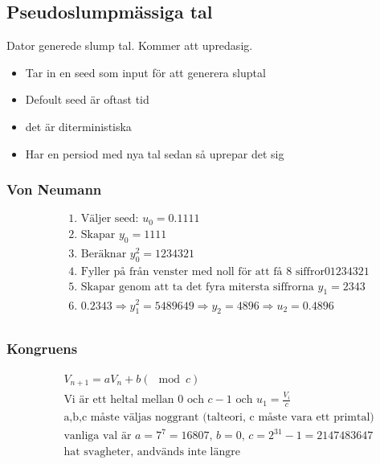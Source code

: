 \subsection{Pseudoslumpmässiga tal}
Dator generede slump tal. Kommer att upredasig.
\begin{itemize}
  \item Tar in en seed som input för att generera sluptal
  \item Defoult seed är oftast tid
  \item det är diterministiska
  \item Har en persiod med nya tal sedan så uprepar det sig
\end{itemize}

\subsubsection{Von Neumann}
\begin{align*}
  &\quad  \text{1. Väljer seed: } u_0=0.1111 \\
  &\quad  \text{2. Skapar } y_0=1111 \\
  &\quad  \text{3. Beräknar } y_0^2=1234321 \\
  &\quad  \text{4. Fyller på från venster med noll för att få 8 siffror} 01234321 \\
  &\quad  \text{5. Skapar genom att ta det fyra mitersta siffrorna } y_1=2343 \\
  &\quad  \text{6. } 0.2343 \Rightarrow y_1^2=5489649 \Rightarrow y_2=4896 \Rightarrow u_2=0.4896 \\
\end{align*}

\subsubsection{Kongruens}
\begin{align*}
  &\quad  V_{n+1}=aV_n+b (\mod c) \\
  &\quad  \text{Vi är ett heltal mellan $0$ och $c-1$ och $u_1=\frac{V_i}{c}$ }\\
  &\quad  \text{a,b,c måste väljas noggrant (talteori, c måste vara ett primtal)} \\
  &\quad  \text{vanliga val är } a=7^7=16807, \, b=0, \, c=2^{31}-1= 2 147 483 647 \\
  &\quad  \text{hat svagheter, andvänds inte längre} \\
  &\quad   \\
\end{align*}

